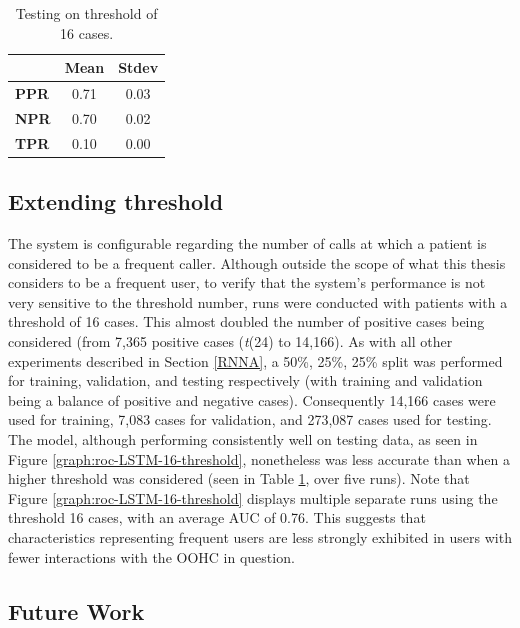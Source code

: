 \begin{table}[ht]
\setlength{\tabcolsep}{8pt}
\centering
\caption{Testing on threshold of 16 cases.}
\label{tab:16-cases}
\begin{tabular}{@{}l|cc@{}}
\toprule
             & \textbf{Mean} & \textbf{Stdev} \\ \midrule
\textbf{PPR} & 0.71          & 0.03           \\
\textbf{NPR} & 0.70          & 0.02           \\
\textbf{TPR} & 0.10          & 0.00           \\ \bottomrule
\end{tabular}
\end{table}

\subsection{Extending threshold}
\label{extending-threshold}

The system is configurable regarding the number of calls at which a patient is considered to be a frequent caller. Although outside the scope of what this thesis considers to be a frequent user, to verify that the system's performance is not very sensitive to the threshold number, runs were conducted with patients with a threshold of 16 cases. This almost doubled the number of positive cases being considered (from 7,365 positive cases (\textit{t}(24) to 14,166). As with all other experiments described in Section \ref{RNNA}, a 50\%, 25\%, 25\% split was performed for training, validation, and testing respectively (with training and validation being a balance of positive and negative cases). Consequently 14,166 cases were used for training, 7,083  cases for validation, and 273,087 cases used for testing. The model, although performing consistently well on testing data, as seen in Figure \ref{graph:roc-LSTM-16-threshold}, nonetheless was less accurate than when a higher threshold was considered (seen in Table \ref{tab:16-cases}, over five runs). Note that Figure \ref{graph:roc-LSTM-16-threshold} displays multiple separate runs using the threshold 16 cases, with an average AUC of 0.76. This suggests that characteristics representing frequent users are less strongly exhibited in users with fewer interactions with the OOHC in question.


\subsection{Future Work}

